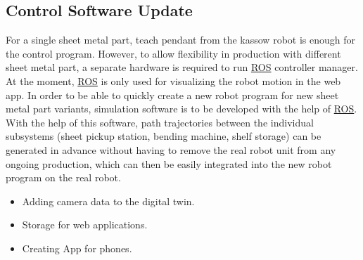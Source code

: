 \subsection{Control Software Update}

For a single sheet metal part, teach pendant from the kassow robot is enough for the control program.
However, to allow flexibility in production with different sheet metal part, a separate hardware is required
to run \hyperref[acro:ROS]{ROS} controller manager.
At the moment, \hyperref[acro:ROS]{ROS} is only used for visualizing the robot motion in the web app.
In order to be able to quickly create a new robot program for new sheet metal part variants, simulation
software is to be developed with the help of \hyperref[acro:ROS]{ROS}. With the help of this software, path trajectories between
the individual subsystems (sheet pickup station, bending machine, shelf storage) can be generated in
advance without having to remove the real robot unit from any ongoing production, which can
then be easily integrated into the new robot program on the real robot.

\begin{itemize}
    \item Adding camera data to the digital twin.
    \item Storage for web applications.
    \item Creating App for phones.
\end{itemize}